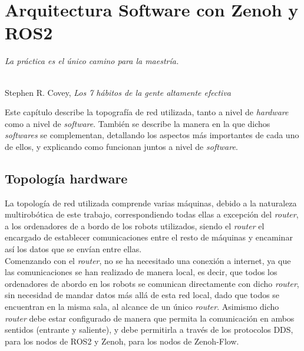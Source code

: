 \chapter{Arquitectura Software con Zenoh y ROS2}
\label{cap:capitulo4}

\begin{flushright}
\begin{minipage}[]{10cm}
\emph{La práctica es el único camino para la maestría.}\\
\end{minipage}\\

Stephen R. Covey, \textit{Los 7 hábitos de la gente altamente efectiva}\\
\end{flushright}

\vspace{1cm}


Este capítulo describe la topografía de red utilizada, tanto a nivel de
\textit{hardware} como a nivel de \textit{software}.
También se describe la manera en la que dichos \textit{softwares} se
complementan, detallando los aspectos más importantes de cada uno de ellos, y
explicando como funcionan juntos a nivel de \textit{software}.



\section{Topología hardware}
\label{sec:topologia_hw}

La topología de red utilizada comprende varias máquinas, debido a la naturaleza
multirobótica de este trabajo, correspondiendo todas ellas a excepción del
\textit{router}, a los ordenadores de a bordo de los robots utilizados, siendo
el \textit{router} el encargado de establecer comunicaciones entre el resto de
máquinas y encaminar así los datos que se envían entre ellas.
\\

Comenzando con el \textit{router}, no se ha necesitado una conexión a internet,
ya que las comunicaciones se han realizado de manera local, es decir, que todos
los ordenadores de abordo en los robots se comunican directamente con dicho
\textit{router}, sin necesidad de mandar datos más allá de esta red local,
dado que todos se encuentran en la misma sala, al alcance de un único
\textit{router}.
Asimismo dicho \textit{router} debe estar configurado de manera que permita la
comunicación en ambos sentidos (entrante y saliente), y debe permitirla a través
de los protocolos DDS, para los nodos de ROS2 y Zenoh, para los nodos de
Zenoh-Flow.
\\

